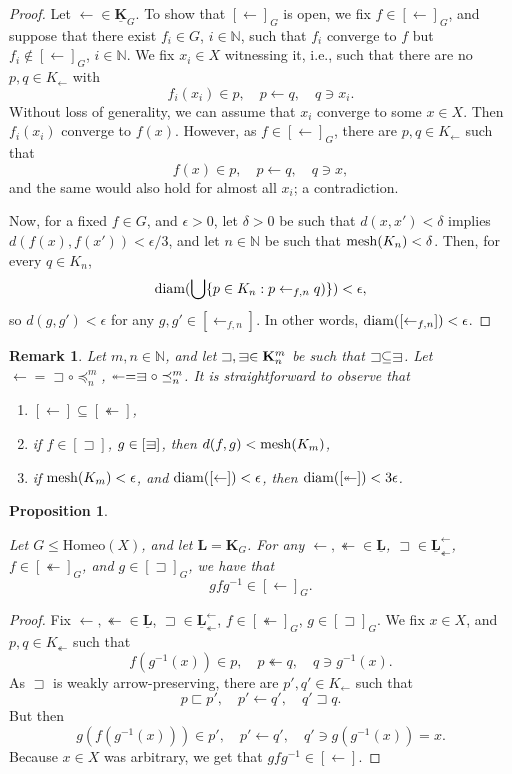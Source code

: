\documentclass[12pt]{amsart}
\numberwithin{equation}{section}
\theoremstyle{plain}
\newtheorem{remark}[theorem]{\bf Remark}
\newtheorem{proposition}[theorem]{\bf Proposition}
\theoremstyle{definition}
\newcommand{\sqni}{\mathrel{\vphantom{\sqsupset}\text{\mathsurround=0pt\ooalign{$\sqsupset$\cr$-$\cr}}}}
\newcommand \Homeo{ \mbox{Homeo}}
\newcommand \mesh{{\rm{ mesh}}}
\newcommand \sqsp{\sqsupset}
\newcommand \sqsb{\sqsubset}
\newcommand \la{\leftarrow}
\newcommand \tla{\twoheadleftarrow}
\newcommand \diam{{\rm{ diam}}}
\newcommand \KKb{\mathbf{K}}
\newcommand \LLb{\mathbf{L}}
\newcommand \KKub{\underline{\mathbf{K}}}
\newcommand \LLub{\underline{\mathbf{L}}}
\newcommand \NN{\mathbb{N}}
\begin{document}
\begin{proof}
Let $\la \in \KKub_G$. To show that $[\la]_G$ is open, we fix $f \in [\la]_G$, and suppose that there exist $f_i \in G$, $i \in \NN$, such that $f_i$ converge  to $f$ but  $f_i \not \in [\la]_G$, $i \in \NN$. We fix $x_i \in X$ witnessing it, i.e., such that there are no $p,q \in K_\la$ with $$f_i(x_i) \in p, \quad p \la q, \quad q \ni x_i.$$ Without loss of generality, we can assume that $x_i$ converge to some $x \in X$. Then $f_i(x_i)$ converge to $f(x)$. However, as $f \in [\la]_G$, there are $p, q \in K_\la$  such that $$f(x) \in p, \quad p \la q, \quad  q \ni x,$$ and the same would also hold for almost all $x_i$; a contradiction.

Now, for a fixed $f \in G$, and $\epsilon>0$, let $\delta>0$ be such that $d(x,x')<\delta$ implies $d(f(x),f(x'))<\epsilon/3$, and let $n \in \NN$ be such that $\mesh(K_n)<\delta$. Then, for every $q \in K_n$,
%
$$\diam(\bigcup \{p \in K_n: p \la_{f,n} q)\})<\epsilon,$$
%
so $d(g,g')<\epsilon$ for any $g,g' \in [\la_{f,n}]$. In other words, $\diam([\la_{f,n}])<\epsilon$.
\end{proof}

\begin{remark}
	\label{re:ExtendMor}
	Let $m, n \in \NN$, and let $\sqsp, \sqni \in \KKb^m_n$ be such that $\sqsp \subseteq \sqni$. Let $\la=\sqsp \circ \preceq^m_n$, $\twoheadleftarrow=\sqni \circ \preceq^m_n$. It is straightforward to observe that	 
	\begin{enumerate}
			\item $[\la] \subseteq [\twoheadleftarrow]$,
		\item if $f \in [\sqsp]$, $g \in [\sqni]$, then $d(f,g)<\mesh(K_m)$,	
		\item if $\mesh(K_m)<\epsilon$, and $\diam([\la])<\epsilon$, then $\diam([\twoheadleftarrow])<3\epsilon$.   
	\end{enumerate}
\end{remark}


\begin{proposition}
	\label{pr:DownwardClosed}
	
	Let $G \leq \Homeo(X)$, and let $\LLb=\KKb_G$. For any $\la, \twoheadleftarrow \in \LLub$, $\sqsp \in \LLub^\la_{\tla}$, $f \in [\twoheadleftarrow]_G$, and $g\in [\sqsp]_G$, we have that $$gfg^{-1} \in [\la]_G.$$ 
\end{proposition}

\begin{proof}
	Fix $\la, \twoheadleftarrow \in \LLub$, $\sqsp \in \LLub^\la_{\tla}$, $f \in [\twoheadleftarrow]_G$, $g\in [\sqsp]_G$.
	We fix $x \in X$, and $p,q \in K_\twoheadleftarrow$ such that $$f(g^{-1}(x)) \in p, \quad  p \twoheadleftarrow q, \quad q \ni g^{-1}(x).$$ As $\sqsp$ is weakly arrow-preserving, there are $p', q' \in K_\la$ such that $$p \sqsb p', \quad p' \la q', \quad q' \sqsp q.$$ But then $$g(f(g^{-1}(x))) \in p', \quad  p' \la q', \quad q' \ni g(g^{-1}(x))=x.$$ Because $x \in X$ was arbitrary, we get that $gfg^{-1} \in [\la]$. %
\end{proof}
\end{document}
